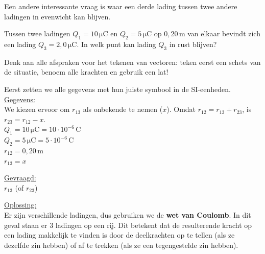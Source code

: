 \documentclass{ximera}
\begin{document}
Een andere interessante vraag is waar een derde lading tussen twee andere ladingen in evenwicht kan blijven.

\begin{example}[foldable=true,title={Voorbeeld: drie ladingen op één lijn of lading in evenwicht}]\nl
    Tussen twee ladingen $Q_{1} = 10 \, \mathrm{\mu C}$ en $Q_{2} = 5 \, \mathrm{\mu C}$ op $0{,}20 \, \mathrm{m}$ van elkaar bevindt zich een lading $Q_{3} = 2{,}0 \, \mathrm{\mu C}$. In welk punt kan lading $Q_{3}$ in rust blijven?
    
    \begin{hint}
        Denk aan alle afspraken voor het tekenen van vectoren: teken eerst een schets van de situatie, benoem alle krachten en gebruik een lat!
    \end{hint}
    
    \begin{solution}\nl
        Eerst zetten we alle gegevens met hun juiste symbool in de SI-eenheden.\\[1ex]
        
        \underline{Gegevens:}\\
        We kiezen ervoor om $r_{13}$ als onbekende te nemen ($x$). Omdat $r_{12} = r_{13} + r_{23}$, is $r_{23} = r_{12} - x$.\\[1ex]
        $Q_{1} = 10 \, \mathrm{\mu C} = 10 \cdot 10^{-6} \, \mathrm{C}$\\
        $Q_{2} = 5 \, \mathrm{\mu C} = 5 \cdot 10^{-6} \, \mathrm{C}$\\
        $r_{12} = 0{,}20 \, \mathrm{m}$\\
        $r_{13} = x$
        
        \vspace{2ex}
        \underline{Gevraagd:}\\
        $r_{13}$ (of $r_{23}$)
        
        \vspace{2ex}
        \underline{Oplossing:}\\
        Er zijn verschillende ladingen, dus gebruiken we de \textbf{wet van Coulomb}. In dit geval staan er 3 ladingen op een rij. Dit betekent dat de resulterende kracht op een lading makkelijk te vinden is door de deelkrachten op te tellen (als ze dezelfde zin hebben) of af te trekken (als ze een tegengestelde zin hebben).
        

\end{solution}
\end{example}
\end{document}
